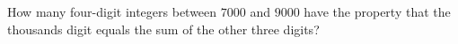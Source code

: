 How many four-digit integers between $7000$ and $9000$ have the property that the thousands digit equals the sum of the other three digits?
